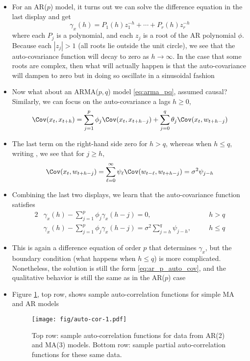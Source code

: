 \documentclass{article}
\begin{document}
\begin{itemize}
\item For an AR($p$) model, it turns out we can solve the difference equation in
  the 
  last display and get
  \begin{equation}
  \label{eq:ar_p_auto_cov}
  \gamma_x(h) = P_1(h) z_1^{-h} + \cdots + P_r(h) z_r^{-h}
  \end{equation}
  where each $P_j$ is a polynomial, and each $z_j$ is a root of the AR
  polynomial $\phi$. Because each $|z_j| > 1$ (all roots lie outside the unit
  circle), we see that the auto-covariance function will decay to zero as $h \to
  \infty$. In the case that some roots are complex, then what will actually 
  happen is that the auto-covariance will dampen to zero but in doing so
  oscillate in a sinusoidal fashion

\item Now what about an ARMA($p,q$) model \eqref{eq:arma_pq}, assumed
  causal? Similarly, we can focus on the auto-covariance a lags $h \geq 0$, 
  \[
  \Cov(x_t, x_{t+h}) = \sum_{j=1}^p \phi_j \Cov(x_t, x_{t+h-j}) + \sum_{j=0}^q 
  \theta_j \Cov(x_t, w_{t+h-j})  
  \]

\item The last term on the right-hand side zero for $h>q$, whereas when $h \leq
  q$, writing , we see
  that for $j \geq h$, 
  \[
  \Cov(x_t, w_{t+h-j}) = \sum_{\ell=0}^\infty \psi_\ell \Cov(w_{t-\ell},
  w_{t+h-j}) = \sigma^2 \psi_{j-h}   
  \]

\item Combining the last two displays, we learn that the auto-covariance
  function satisfies 
  \begin{alignat*}{2}
  &\gamma_x(h) - \sum_{j=1}^p \phi_j \gamma_x(h-j) = 0, \quad &&h > q \\ 
  &\gamma_x(h) - \sum_{j=1}^p \phi_j \gamma_x(h-j) = \sigma^2 \sum_{j=h}^q
    \psi_{j-h}, \quad &&h \leq q
  \end{alignat*}

\item This is again a difference equation of order $p$ that determines
  $\gamma_x$, but the boundary condition (what happens when $h \leq q$) is more
  complicated. Nonetheless, the solution is still the form
  \eqref{eq:ar_p_auto_cov}, and the qualitative behavior is still the same as in 
  the AR($p$) case   

\item Figure \ref{fig:auto_cor}, top row, shows sample auto-correlation
  functions for simple MA and AR models 

\begin{figure}[htb]
\centering
\texttt{[image: fig/auto-cor-1.pdf]}
\caption{Top row: sample auto-correlation functions for data from AR(2) and
  MA(3) models. Bottom row: sample partial auto-correlation functions for these
  same data.} 
\label{fig:auto_cor}
\end{figure}
\end{itemize}
\end{document}
